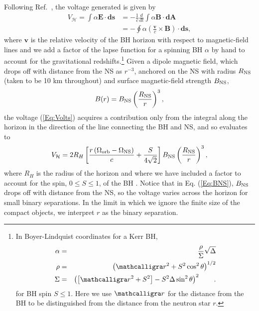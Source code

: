 Following Ref.\ \cite{McL:2011}, the voltage generated is given by
\begin{align}
V_{\mathcal{H}} = \int{ \alpha \mathbf{E} \cdot \mathbf{ds} } &= 
%
- \frac{1}{c} \frac{d}{dt} \int{ \alpha   \mathbf{B} \cdot \mathbf{dA} } \nonumber \\
%
&= -\oint{ \alpha \left( \frac{\mathbf{v}}{c} \times \mathbf{B} \right) \cdot \mathbf{ds} },
\label{Eq:Volts}
\end{align}
where $\mathbf{v}$ is the relative velocity of the BH horizon with respect to magnetic-field lines and we add a factor of the lapse function for a spinning BH $\alpha$
by hand to account for the gravitational redshifts.\footnote{In
  Boyer-Lindquist coordinates for a Kerr BH,
\begin{eqnarray}
\alpha &=& \frac{\rho}{\Sigma}\sqrt{\Delta} \\ \rho &=& \left (\rbh^2
+S^2\cos^2\theta \right )^{1/2} \nonumber \\ \Sigma &=& \left (\left
[\rbh^2+S^2\right ]-S^2\Delta \sin^2\theta \right )^2 \nonumber \quad
\quad .
\end{eqnarray}
for BH spin $S\le 1$. Here we use $\rbh$ for the distance from the BH
to be distinguished from the distance from the neutron star $r$.}
%
Given a dipole magnetic field, which drops off with distance from the
NS as $r^{-3}$, anchored on the NS with radius $R_{\rm NS}$ (taken to be 10 km throughout) and surface
magnetic-field strength $B_{\rm NS}$,
\begin{equation}
B(r)=B_{\rm NS}\left (\frac{R_{\rm NS}}{r}\right )^3,
\label{Eq:BNS}
\end{equation}
the voltage (\ref{Eq:Volts}) acquires a contribution only from the
integral along the horizon in the direction of the line connecting the
BH and NS, and so evaluates to
\begin{align}
\label{HVolt}
V_{\mathcal{H}} = 2 R_H \left[ \frac{r \left (\Omega_{\rm{orb}} - \Omega_{\rm
    NS} \right)}{c} + \frac{S}{4\sqrt{2}} \right] B_{\rm NS}
\left(\frac{R_{\rm NS}}{r} \right)^3,
\end{align} 
where $R_{H}$ is the radius of the horizon and where we have included
a factor to account for the spin, $0 \leq S \leq 1$, of the BH
\cite{McL:2011}. Notice that in Eq. (\ref{Eq:BNS}), $B_{\rm{NS}}$
drops off with distance from the NS, so the voltage varies across the
horizon for small binary separations. In the limit in which we ignore
the finite size of the compact objects, we interpret $r$ as the binary
separation.

